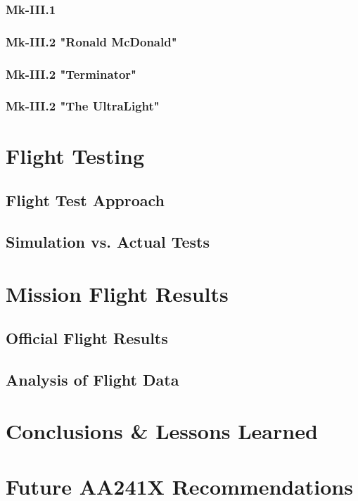 \documentclass[11pt]{article}
\begin{document}
\subsubsection{Mk-III.1}
\label{mk3.1}
\subsubsection{Mk-III.2 "Ronald McDonald"}
\label{mk3.2}
\subsubsection{Mk-III.2 "Terminator"}
\label{mk3.3}
\subsubsection{Mk-III.2 "The UltraLight"}
\label{mk3.4}

\section{Flight Testing}
\label{FlightTesting}
\subsection{Flight Test Approach}
\label{FltTstAppr}
\subsection{Simulation vs. Actual Tests}
\label{simvsact}

\section{Mission Flight Results}
\label{MissionFlightResults}
\subsection{Official Flight Results}
\label{OffFltRes}
\subsection{Analysis of Flight Data}
\label{AnalFltData}


\section{Conclusions \& Lessons Learned}
\label{Conclusion}

\section{Future AA241X Recommendations}
\label{Recommendations}
\end{document}
